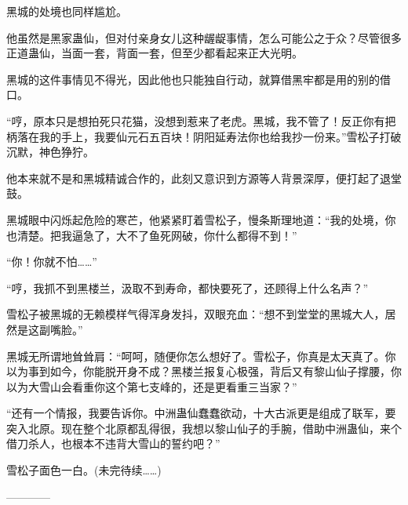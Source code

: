 \begin{this_body}
黑城的处境也同样尴尬。

他虽然是黑家蛊仙，但对付亲身女儿这种龌龊事情，怎么可能公之于众？尽管很多正道蛊仙，当面一套，背面一套，但至少都看起来正大光明。

黑城的这件事情见不得光，因此他也只能独自行动，就算借黑牢都是用的别的借口。

“哼，原本只是想拍死只花猫，没想到惹来了老虎。黑城，我不管了！反正你有把柄落在我的手上，我要仙元石五百块！阴阳延寿法你也给我抄一份来。”雪松子打破沉默，神色狰狞。

他本来就不是和黑城精诚合作的，此刻又意识到方源等人背景深厚，便打起了退堂鼓。

黑城眼中闪烁起危险的寒芒，他紧紧盯着雪松子，慢条斯理地道：“我的处境，你也清楚。把我逼急了，大不了鱼死网破，你什么都得不到！”

“你！你就不怕……”

“哼，我抓不到黑楼兰，汲取不到寿命，都快要死了，还顾得上什么名声？”

雪松子被黑城的无赖模样气得浑身发抖，双眼充血：“想不到堂堂的黑城大人，居然是这副嘴脸。”

黑城无所谓地耸耸肩：“呵呵，随便你怎么想好了。雪松子，你真是太天真了。你以为事到如今，你能脱开身不成？黑楼兰报复心极强，背后又有黎山仙子撑腰，你以为大雪山会看重你这个第七支峰的，还是更看重三当家？”

“还有一个情报，我要告诉你。中洲蛊仙蠢蠢欲动，十大古派更是组成了联军，要突入北原。现在整个北原都乱得很，我想以黎山仙子的手腕，借助中洲蛊仙，来个借刀杀人，也根本不违背大雪山的誓约吧？”

雪松子面色一白。(未完待续……)

------------

\end{this_body}

